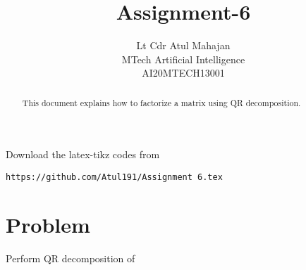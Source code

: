 \documentclass[journal,12pt,twocolumn]{IEEEtran}
\begin{document}
\makeatletter
{}
\makeatother
\let\StandardTheFigure\thefigure
\let\vec\mathbf
\renewcommand{\thefigure}{\theproblem}
\def\putbox#1#2#3{\makebox[0in][l]{\makebox[#1][l]{}\raisebox{\baselineskip}[0in][0in]{\raisebox{#2}[0in][0in]{#3}}}}
     \def\rightbox#1{\makebox[0in][r]{#1}}
     \def\centbox#1{\makebox[0in]{#1}}
     \def\topbox#1{\raisebox{-\baselineskip}[0in][0in]{#1}}
     \def\midbox#1{\raisebox{-0.5\baselineskip}[0in][0in]{#1}}
\vspace{3cm}
\title{Assignment-6\\}
\author{Lt Cdr Atul Mahajan\\MTech Artificial Intelligence\\AI20MTECH13001 }
\maketitle
\newpage
\bigskip
\renewcommand{\thefigure}{\theenumi}
\renewcommand{\thetable}{\theenumi}
\begin{abstract}
This  document explains how to factorize a matrix using QR decomposition. 
\end{abstract}
Download the latex-tikz codes from 
%
%
%
\begin{lstlisting}
https://github.com/Atul191/Assignment 6.tex
\end{lstlisting}
%
\section{Problem}
Perform QR decomposition of  
\end{document}

